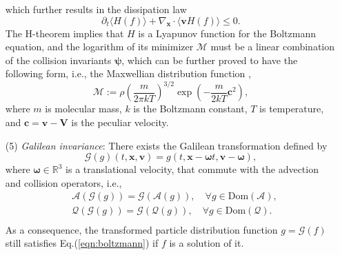 \documentclass[preprint,3p,12pt,sort&compress]{elsarticle}
\begin{document}
\begin{enumerate}
\begin{equation}
  \end{equation}
  which further results in the dissipation law
  \begin{equation}
      \partial_t \langle H(f) \rangle + \nabla_\mathbf x \cdot \langle \mathbf v H(f) \rangle \leq 0.
  \end{equation}
  The H-theorem implies that $H$ is a Lyapunov function for the Boltzmann equation, and the logarithm of its minimizer $\mathcal M$ must be a linear combination of the collision invariants $\boldsymbol\psi$,
    which can be further proved to have the following form, i.e., the Maxwellian distribution function \cite{bouchut2000kinetic},
    \begin{equation}
    	\mathcal M := \rho\left(\frac{m}{2\pi k T}\right)^{3/2} \exp\left(-\frac{m}{2kT} \mathbf c^2\right),
    	\label{eqn:maxwellian}
    \end{equation}
    where $m$ is molecular mass, $k$ is the Boltzmann constant, $T$ is temperature, and $\mathbf c=\mathbf v-\mathbf V$ is the peculiar velocity.
  \item[(5)] \textit{Galilean invariance}: There exists the Galilean transformation defined by 
  \begin{equation}
      \mathcal G(g)(t,\mathbf x,\mathbf v)=g(t,\mathbf x-\boldsymbol\omega t,\mathbf v-\boldsymbol\omega),
      \label{eqn:galilean}
  \end{equation}
  where $\boldsymbol \omega \in \mathbb R^3$ is a translational velocity, that commute with the advection and collision operators, i.e.,
  \begin{equation}
    \begin{aligned}
        &\mathcal A(\mathcal G(g)) = \mathcal G(\mathcal A(g)), \quad \forall g \in \mathrm{Dom}(\mathcal A), \\
        &\mathcal Q(\mathcal G(g)) = \mathcal G(\mathcal Q(g)), \quad \forall g \in \mathrm{Dom}(\mathcal Q). \\
    \end{aligned}
  \end{equation}
  As a consequence, the transformed particle distribution function $g=\mathcal G(f)$ still satisfies Eq.(\ref{eqn:boltzmann}) if $f$ is a solution of it.
\end{enumerate}
\end{document}
